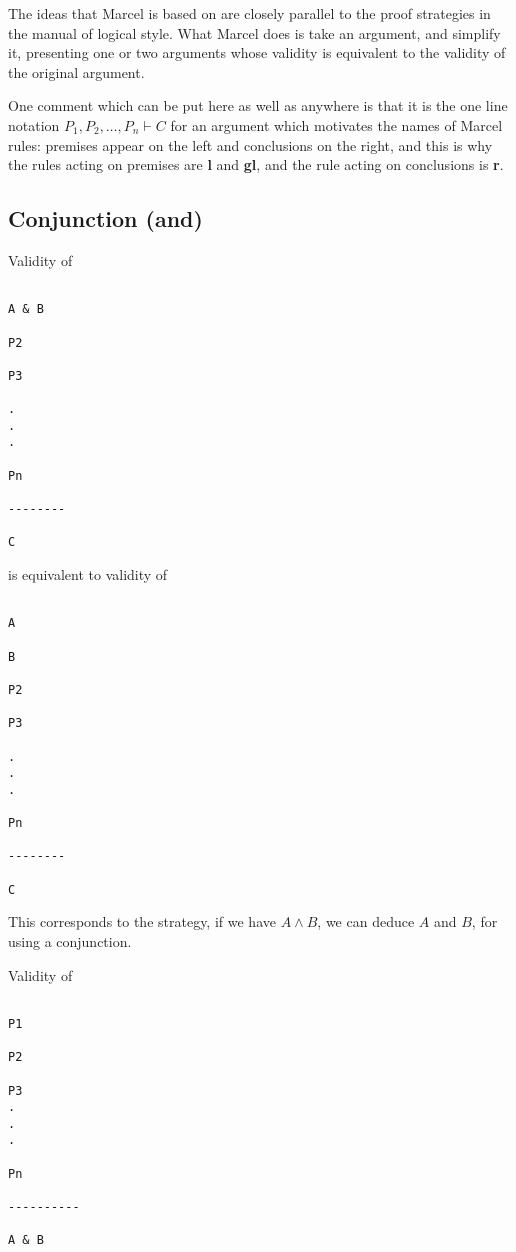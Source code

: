 \documentclass[12pt]{article}
\begin{document}
The ideas that Marcel is based on are closely parallel to the proof strategies in the manual of logical style.  What Marcel does is take an argument, and simplify it, presenting one or two arguments whose validity is equivalent to the validity of the original argument.

One comment which can be put here as well as anywhere is that it is the one line notation
$P_1, P_2, \ldots, P_n \vdash C$ for an argument which motivates the names of Marcel rules:  premises appear on the left and conclusions on the right, and this is why the rules acting on premises are {\bf l} and {\bf gl}, and the rule acting on conclusions is {\bf r}.

\newpage

\subsection{Conjunction (and)}

Validity of

\begin{verbatim}

A & B

P2

P3

.
.
. 

Pn

--------

C

\end{verbatim}

is equivalent to validity of 

\newpage

\begin{verbatim}

A

B

P2

P3

.
.
. 

Pn

--------

C

\end{verbatim}

This corresponds to the strategy, if we have $A \wedge B$, we can deduce $A$ and $B$, for using a conjunction.

\newpage

Validity of 

\begin{verbatim}

P1

P2 

P3 
.
.
.

Pn

----------

A & B

\end{verbatim}
\end{document}
